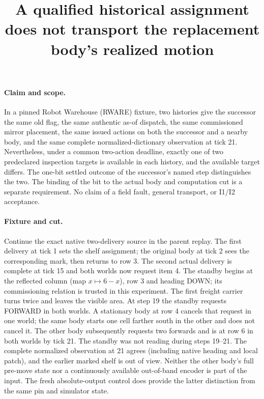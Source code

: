 \documentclass{article}
\begin{document}
\title{A qualified historical assignment does not transport the replacement body's realized motion}
\maketitle

\paragraph{Claim and scope.}
In a pinned Robot Warehouse (RWARE) fixture, two histories give the successor the
same old flag, the same authentic as-of dispatch, the same commissioned mirror
placement, the same issued actions on both the successor and a nearby body, and
the same complete normalized-dictionary observation at tick 21. Nevertheless,
under a common two-action deadline, exactly one of two predeclared inspection
targets is available in each history, and the available target differs. The
one-bit settled outcome of the successor's named step distinguishes the two.
The binding of the bit to the actual body and computation cut is a separate
requirement. No claim of a field fault, general transport, or I1/I2 acceptance.

\paragraph{Fixture and cut.}
Continue the exact native two-delivery source in the parent replay. The first
delivery at tick 1 sets the shelf assignment; the original body at tick 2 sees
the corresponding mark, then returns to row 3. The second actual delivery is
complete at tick 15 and both worlds now request item 4. The standby begins at
the reflected column (map $x\mapsto6-x$), row 3 and heading DOWN; its commissioning
relation is trusted in this experiment. The first freight carrier turns twice
and leaves the visible area. At step 19 the standby requests FORWARD in both
worlds. A stationary body at row 4 cancels that request in one world; the
same body starts one cell farther south in the other and does not cancel it.
The other body subsequently requests two forwards and is at row 6 in both
worlds by tick 21. The standby was not reading during steps 19--21. The complete
normalized observation at 21 agrees (including native heading and local patch),
and the earlier marked shelf is out of view. Neither the other body's full
pre-move state nor a continuously available out-of-band encoder is part of the
input. The fresh absolute-output control does provide the latter distinction
from the same pin and simulator state.
\end{document}
